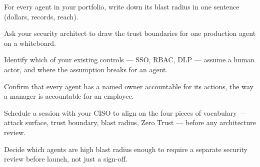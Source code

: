 \begin{TNchecklist}
\item For every agent in your portfolio, write down its blast radius in one sentence (dollars, records, reach).
\item Ask your security architect to draw the trust boundaries for one production agent on a whiteboard.
\item Identify which of your existing controls --- SSO, RBAC, DLP --- assume a human actor, and where the assumption breaks for an agent.
\item Confirm that every agent has a named owner accountable for its actions, the way a manager is accountable for an employee.
\item Schedule a session with your CISO to align on the four pieces of vocabulary --- attack surface, trust boundary, blast radius, Zero Trust --- before any architecture review.
\item Decide which agents are high blast radius enough to require a separate security review before launch, not just a sign-off.
\end{TNchecklist}


